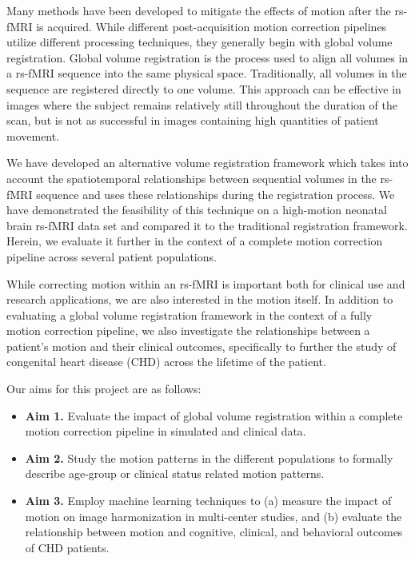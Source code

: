 Many methods have been developed to mitigate the effects of motion after the rs-fMRI is acquired. While different post-acquisition motion correction pipelines utilize different processing techniques, they generally begin with global volume registration. Global volume registration is the process used to align all volumes in a rs-fMRI sequence into the same physical space. Traditionally, all volumes in the sequence are registered directly to one volume. This approach can be effective in images where the subject remains relatively still throughout the duration of the scan, but is not as successful in images containing high quantities of patient movement.

We have developed an alternative volume registration framework which takes into account the spatiotemporal relationships between sequential volumes in the rs-fMRI sequence and uses these relationships during the registration process. We have demonstrated the feasibility of this technique on a high-motion neonatal brain rs-fMRI data set and compared it to the traditional registration framework. Herein, we evaluate it further in the context of a complete motion correction pipeline across several patient populations. 

While correcting motion within an rs-fMRI is important both for clinical use and research applications, we are also interested in the motion itself. In addition to evaluating a global volume registration framework in the context of a fully motion correction pipeline, we also investigate the relationships between a patient's motion and their clinical outcomes, specifically to further the study of congenital heart disease (CHD) across the lifetime of the patient. %


Our aims for this project are as follows:
\begin{itemize}
\item \textbf{Aim 1.} Evaluate the impact of global volume registration within a complete motion correction pipeline in simulated and clinical data.
\item \textbf{Aim 2.} Study the motion patterns in the different populations to formally describe age-group or clinical status related motion patterns.
\item \textbf{Aim 3.} Employ machine learning techniques to (a) measure the impact of motion on image harmonization in multi-center studies, and (b) evaluate the relationship between motion and cognitive, clinical, and behavioral outcomes of CHD patients.
\end{itemize}


